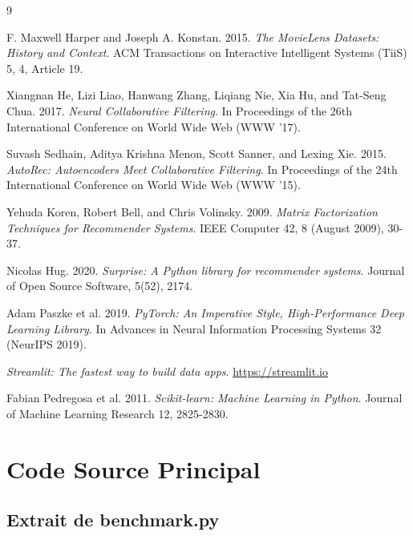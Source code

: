 \documentclass[12pt,a4paper]{article}
\begin{document}
\begin{thebibliography}{9}

F. Maxwell Harper and Joseph A. Konstan. 2015.
\textit{The MovieLens Datasets: History and Context}.
ACM Transactions on Interactive Intelligent Systems (TiiS) 5, 4, Article 19.

Xiangnan He, Lizi Liao, Hanwang Zhang, Liqiang Nie, Xia Hu, and Tat-Seng Chua. 2017.
\textit{Neural Collaborative Filtering}.
In Proceedings of the 26th International Conference on World Wide Web (WWW '17).

Suvash Sedhain, Aditya Krishna Menon, Scott Sanner, and Lexing Xie. 2015.
\textit{AutoRec: Autoencoders Meet Collaborative Filtering}.
In Proceedings of the 24th International Conference on World Wide Web (WWW '15).

Yehuda Koren, Robert Bell, and Chris Volinsky. 2009.
\textit{Matrix Factorization Techniques for Recommender Systems}.
IEEE Computer 42, 8 (August 2009), 30-37.

Nicolas Hug. 2020.
\textit{Surprise: A Python library for recommender systems}.
Journal of Open Source Software, 5(52), 2174.

Adam Paszke et al. 2019.
\textit{PyTorch: An Imperative Style, High-Performance Deep Learning Library}.
In Advances in Neural Information Processing Systems 32 (NeurIPS 2019).

\textit{Streamlit: The fastest way to build data apps}.
\url{https://streamlit.io}

Fabian Pedregosa et al. 2011.
\textit{Scikit-learn: Machine Learning in Python}.
Journal of Machine Learning Research 12, 2825-2830.

\end{thebibliography}

\appendix

\section{Code Source Principal}

\subsection{Extrait de benchmark.py}
\end{document}
